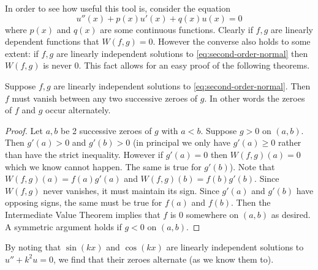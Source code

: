 In order to see how useful this tool is, consider the equation
\begin{equation}\label{eq:second-order-normal}
    u''(x) + p(x) u'(x) + q(x) u(x) = 0 
\end{equation}
where $p(x)$ and $q(x)$ are some continuous functions. 
Clearly if $f, g$ are linearly dependent functions that $W(f, g) = 0$. However the converse also holds to some extent: if $f, g$ are linearly independent solutions to \autoref{eq:second-order-normal} then $W(f, g)$ is never 0. This fact allows for an easy proof of the following theorems.

\begin{theorem}
Suppose $f, g$ are linearly independent solutions to \eqref{eq:second-order-normal}. Then $f$ must vanish between any two successive zeroes of $g$. In other words the zeroes of $f$ and $g$ occur alternately.
\end{theorem}
\begin{proof}
Let $a, b$ be 2 successive zeroes of $g$ with $a < b$. Suppose $g > 0$ on $(a, b)$. Then $g'(a) > 0$ and $g'(b) > 0$ (in principal we only have $g'(a) \geq 0$ rather than have the strict inequality. However if $g'(a) = 0$ then $W(f, g)(a) = 0$ which we know cannot happen. The same is true for $g'(b)$). Note that $W(f, g)(a) = f(a) g'(a)$ and $W(f, g)(b) = f(b) g'(b)$. Since $W(f, g)$ never vanishes, it must maintain its sign. Since $g'(a)$ and $g'(b)$ have opposing signs, the same must be true for $f(a)$ and $f(b)$. Then the Intermediate Value Theorem implies that $f$ is 0 somewhere on $(a, b)$ as desired. A symmetric argument holds if $g < 0$ on $(a, b)$.
\end{proof}
\begin{remark}
By noting that $\sin (kx)$ and $\cos (kx)$ are linearly independent solutions to $u'' + k^2 u = 0$, we find that their zeroes alternate (as we know them to).
\end{remark}

